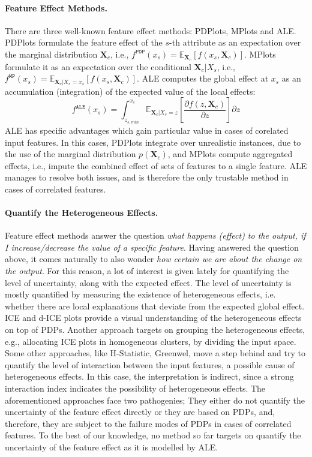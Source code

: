 \documentclass[twoside]{article}
\newcommand{\Xcb}{\mathbf{X}_c}
\begin{document}
\paragraph{Feature Effect Methods.} There are three well-known feature
effect methods: PDPlots, MPlots and ALE. PDPlots formulate the feature effect of the \(s\)-th
attribute as an expectation over the marginal distribution
\(\mathbf{X}_c\), i.e.,
\(f^{\mathtt{PDP}}(x_s) =
\mathbb{E}_{\mathbf{X}_c}[f(x_s,\mathbf{X}_c)]\). MPlots formulate it
as an expectation over the conditional \(\mathbf{X}_c|X_s\), i.e.,
\(f^{\mathtt{MP}}(x_s) = \mathbb{E}_{\mathbf{X}_c|X_s = x_s}[f(x_s,
\mathbf{X}_c)]\). ALE computes the global effect at \(x_s\) as an
accumulation (integration) of the expected value of the local
effects:
\begin{equation}
  \label{eq:ALE_accumulated_mean}
  f^{\mathtt{ALE}}(x_s) = \int_{z_{s,min}}^{x_s} \mathbb{E}_{\Xcb|X_s=z}\left[\frac{\partial f(z, \Xcb)}{\partial z}\right] \partial z
\end{equation}
%
ALE has specific advantages which gain particular value in cases of
corelated input features. In this cases, PDPlots integrate over
unrealistic instances, due to the use of the marginal distribution
\( p(\mathbf{X}_c) \), and MPlots compute aggregated effects, i.e.,
impute the combined effect of sets of features to a single
feature. ALE manages to resolve both issues, and is therefore the only
trustable method in cases of correlated features.

\paragraph{Quantify the Heterogeneous Effects.}

Feature effect methods answer the question \textit{what happens
  (effect) to the output, if I increase/decrease the value of a
  specific feature}. Having answered the question above, it comes
naturally to also wonder \textit{how certain we are about the change
  on the output}. For this reason, a lot of interest is given lately
for quantifying the level of uncertainty, along with the expected
effect. The level of uncertainty is mostly quantified by measuring the
existence of heterogeneous effects, i.e. whether there are local
explanations that deviate from the expected global effect. ICE and
d-ICE plots provide a visual understanding of the heterogeneous
effects on top of PDPs. Another approach targets on grouping the
heterogeneous effects, e.g., allocating ICE plots in homogeneous
clusters, by dividing the input space. Some other approaches, like
H-Statistic, Greenwel, move a step behind and try to quantify the
level of interaction between the input features, a possible cause of
heterogeneous effects. In this case, the interpretation is indirect,
since a strong interaction index indicates the possibility of
heterogeneous effects. The aforementioned approaches face two
pathogenies; They either do not quantify the uncertainty of the
feature effect directly or they are based on PDPs, and, therefore,
they are subject to the failure modes of PDPs in cases of correlated
features. To the best of our knowledge, no method so far targets on
quantify the uncertainty of the feature effect as it is modelled by
ALE.
\end{document}
